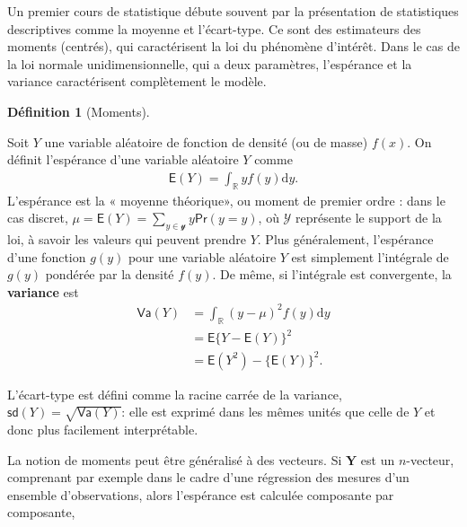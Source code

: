 \documentclass[
  11pt,
  letterpaper,
]{scrbook}
\theoremstyle{definition}
\newtheorem{definition}{Définition}[chapter]
\theoremstyle{definition}
\theoremstyle{remark}
\begin{document}
Un premier cours de statistique débute souvent par la présentation de
statistiques descriptives comme la moyenne et l'écart-type. Ce sont des
estimateurs des moments (centrés), qui caractérisent la loi du phénomène
d'intérêt. Dans le cas de la loi normale unidimensionnelle, qui a deux
paramètres, l'espérance et la variance caractérisent complètement le
modèle.

\begin{definition}[Moments]\protect\hypertarget{def-moments}{}\label{def-moments}

Soit \(Y\) une variable aléatoire de fonction de densité (ou de masse)
\(f(x)\). On définit l'espérance d'une variable aléatoire \(Y\) comme
\begin{align*}
\mathsf{E}(Y)=\int_{\mathbb{R}} y f(y) \mathrm{d} y.
\end{align*} L'espérance est la « moyenne théorique», ou moment de
premier ordre : dans le cas discret,
\(\mu = \mathsf{E}(Y)=\sum_{y \in \mathcal{y}} y \mathsf{Pr}(y=y)\), où
\(\mathcal{Y}\) représente le support de la loi, à savoir les valeurs
qui peuvent prendre \(Y\). Plus généralement, l'espérance d'une fonction
\(g(y)\) pour une variable aléatoire \(Y\) est simplement l'intégrale de
\(g(y)\) pondérée par la densité \(f(y)\). De même, si l'intégrale est
convergente, la \textbf{variance} est \begin{align*}
\mathsf{Va}(Y)&=\int_{\mathbb{R}} (y-\mu)^2 f(y) \mathrm{d} y \\&=\mathsf{E}\{Y-\mathsf{E}(Y)\}^2 \\&= \mathsf{E}(Y^2) - \{\mathsf{E}(Y)\}^2.
\end{align*}

L'écart-type est défini comme la racine carrée de la variance,
\(\mathsf{sd}(Y)=\sqrt{\mathsf{Va}(Y)}\): elle est exprimé dans les
mêmes unités que celle de \(Y\) et donc plus facilement interprétable.

La notion de moments peut être généralisé à des vecteurs. Si
\(\boldsymbol{Y}\) est un \(n\)-vecteur, comprenant par exemple dans le
cadre d'une régression des mesures d'un ensemble d'observations, alors
l'espérance est calculée composante par composante,


\end{definition}
\end{document}
